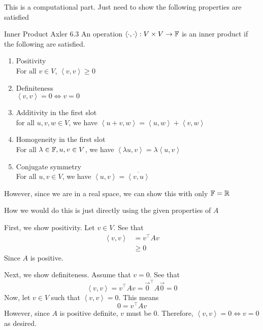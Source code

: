 \documentclass[answers]{exam}
\newcommand{\ip}[1]{\left\langle#1\right\rangle}
\begin{document}
\begin{questions}
\begin{parts}
\begin{solution}
            This is a computational part. Just need to show the following properties are satisfied
            \begin{defin} Inner Product Axler 6.3
                An operation $\ip{\cdot,\cdot}:V\times V \rightarrow \F$ is an inner product if the
                following are satisfied.
                \begin{enumerate}
                    \item Positivity\\
                        For all $v\in V$, $\ip{v,v} \geq 0$
                    \item Definiteness\\
                        $\ip{v,v} = 0 \iff v=0$
                    \item Additivity in the first slot\\
                        for all $u,v,w\in V$, we have $\ip{u+v,w} = \ip{u,w} + \ip{v,w}$
                    \item Homogeneity in the first slot\\
                        For all $\lambda\in\mathbb{F}, u,v\in V$, we have $\ip{\lambda u,v} = \lambda\ip{u,v}$
                    \item Conjugate symmetry\\
                        For all $u,v\in V$, we have $\ip{u,v} = \overline{\ip{v,u}}$
                \end{enumerate}
            \end{defin}
            However, since we are in a real space, we can show this with only $\mathbb{F}=\mathbb{R}$

            How we would do this is just directly using the given properties of $A$


            First, we show positivity. Let $v\in V$. See that 
            \begin{align*}
                \ip{v,v} &= v^\top Av \\
                &\geq 0
            \end{align*}
            Since $A$ is positive.

            Next, we show definiteness. Assume that $v=0$. See that
            \[
                \ip{v,v} = v^\top Av = \vec{0}^\top A\vec{0} = 0
            \]
            Now, let $v\in V$ such that $\ip{v,v} = 0$. This means
            \[
                0 = v^\top Av
            \]
            However, since $A$ is positive definite, $v$ must be $0$. Therefore, $\ip{v,v} = 0 \iff v=0$ as 
            desired.


\end{solution}
\end{parts}
\end{questions}
\end{document}
